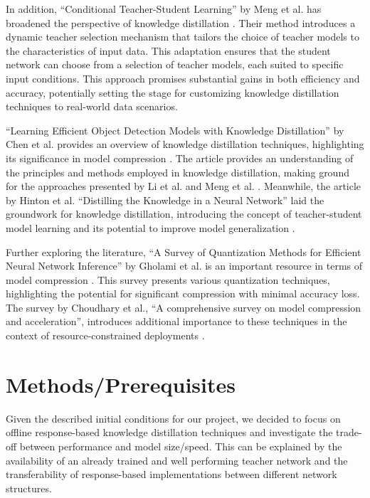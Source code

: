 \documentclass{article}
\begin{document}
In addition, “Conditional Teacher-Student Learning” by Meng et al. has broadened the perspective of knowledge distillation \cite{meng2019conditional}. Their method introduces a dynamic teacher selection mechanism that tailors the choice of teacher models to the characteristics of input data. This adaptation ensures that the student network can choose from a selection of teacher models, each suited to specific input conditions. This approach promises substantial gains in both efficiency and accuracy, potentially setting the stage for customizing knowledge distillation techniques to real-world data scenarios.

“Learning Efficient Object Detection Models with Knowledge Distillation” by Chen et al. provides an overview of knowledge distillation techniques, highlighting its significance in model compression \cite{chenLearningEfficientObject2017}. The article provides an understanding of the principles and methods employed in knowledge distillation, making ground for the approaches presented by Li et al. \cite{li2023curriculum} and Meng et al. \cite{meng2019conditional}. Meanwhile, the article by Hinton et al. “Distilling the Knowledge in a Neural Network” laid the groundwork for knowledge distillation, introducing the concept of teacher-student model learning and its potential to improve model generalization \cite{hintonDistillingKnowledgeNeural2015}.

Further exploring the literature, “A Survey of Quantization Methods for Efficient Neural Network Inference” by Gholami et al. is an important resource in terms of model compression \cite{gholamiSurveyQuantizationMethods2021}. This survey presents various quantization techniques, highlighting the potential for significant compression with minimal accuracy loss. The survey by Choudhary et al., “A comprehensive survey on model compression and acceleration”, introduces additional importance to these techniques in the context of resource-constrained deployments \cite{choudharyComprehensiveSurveyModel2020}.
\newpage
\section{Methods/Prerequisites}
Given the described initial conditions for our project, we decided to focus on offline response-based knowledge distillation techniques and investigate the trade-off between performance and model size/speed. This can be explained by the availability of an already trained and well performing teacher network and the transferability of response-based implementations between different network structures.
\end{document}
